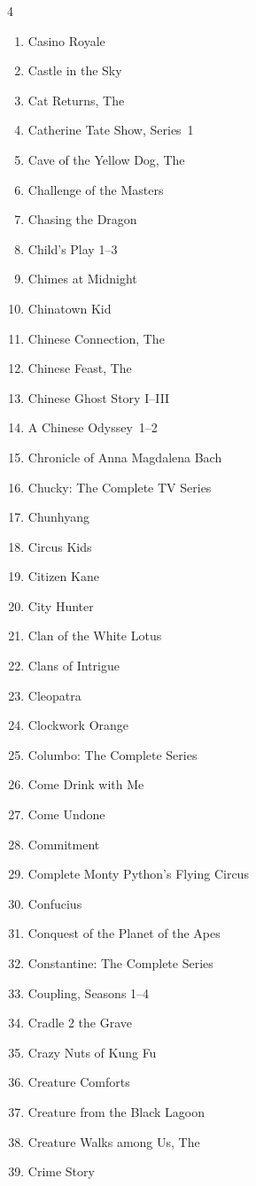 \documentclass{article}
\begin{document}
\begin{multicols}{4}
\begin{enumerate}
\item Casino Royale
\item Castle in the Sky
\item Cat Returns, The
\item Catherine Tate Show, Series~1
\item Cave of the Yellow Dog, The
\item Challenge of the Masters
\item Chasing the Dragon
\item Child's Play 1--3
\item Chimes at Midnight
\item Chinatown Kid
\item Chinese Connection, The
\item Chinese Feast, The
\item Chinese Ghost Story I--III
\item A Chinese Odyssey~1--2
\item Chronicle of Anna Magdalena Bach
\item Chucky: The Complete TV Series
\item Chunhyang
\item Circus Kids
\item Citizen Kane
\item City Hunter
\item Clan of the White Lotus
\item Clans of Intrigue
\item Cleopatra
\item Clockwork Orange
\item Columbo: The Complete Series
\item Come Drink with Me
\item Come Undone
\item Commitment
\item Complete Monty Python's Flying Circus
\item Confucius
\item Conquest of the Planet of the Apes
\item Constantine: The Complete Series
\item Coupling, Seasons 1--4
\item Cradle 2 the Grave
\item Crazy Nuts of Kung Fu
\item Creature Comforts
\item Creature from the Black Lagoon
\item Creature Walks among Us, The
\item Crime Story

\end{enumerate}
\end{multicols}
\end{document}
